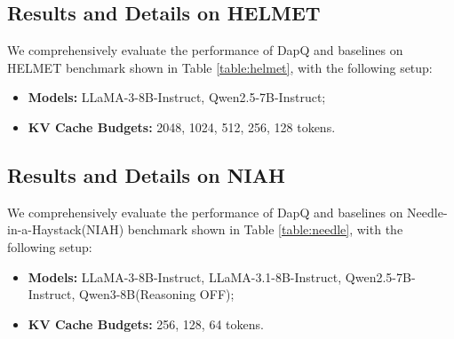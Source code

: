 \documentclass[11pt]{article}
\begin{document}
\subsection{Results and Details on HELMET}
We comprehensively evaluate the performance of DapQ and baselines on HELMET benchmark shown in Table \ref{table:helmet}, with the following setup:
\begin{itemize}[leftmargin=*, nosep] %
    \item \textbf{Models:} LLaMA-3-8B-Instruct, Qwen2.5-7B-Instruct;
    \item \textbf{KV Cache Budgets:} 2048, 1024, 512, 256, 128 tokens.
\end{itemize}


\subsection{Results and Details on NIAH}
We comprehensively evaluate the performance of DapQ and baselines on Needle-in-a-Haystack(NIAH) benchmark shown in Table \ref{table:needle}, with the following setup:
\begin{itemize}[leftmargin=*, nosep] %
    \item \textbf{Models:} LLaMA-3-8B-Instruct, LLaMA-3.1-8B-Instruct, Qwen2.5-7B-Instruct, Qwen3-8B(Reasoning OFF);
    \item \textbf{KV Cache Budgets:} 256, 128, 64 tokens.
\end{itemize}
\end{document}
